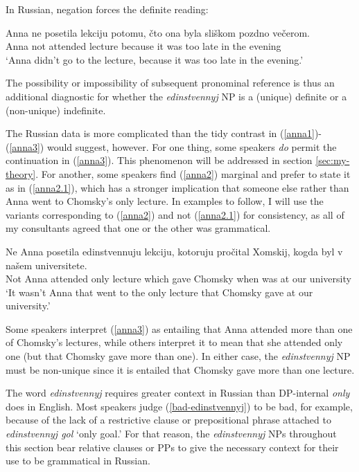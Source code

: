 In Russian, negation forces the definite reading:

\begin{exe}
	\ex \gll Anna ne posetila lekciju {potomu, \v{c}to} ona byla sli\v{s}kom pozdno ve\v{c}erom.\\
	Anna not attended lecture because it was too late {in the evening}\\
	\glt `Anna didn't go to the lecture, because it was too late in the evening.'
\end{exe}

The possibility or impossibility of subsequent pronominal reference is thus an additional diagnostic for whether the \textit{edinstvennyj} NP is a (unique) definite or a (non-unique) indefinite.

The Russian data is more complicated than the tidy contrast in (\ref{anna1})-(\ref{anna3}) would suggest, however. For one thing, some speakers \textit{do} permit the continuation in (\ref{anna3}). This phenomenon will be addressed in section \ref{sec:my-theory}. For another, some speakers find (\ref{anna2}) marginal and prefer to state it as in (\ref{anna2.1}), which has a stronger implication that someone else rather than Anna went to Chomsky's only lecture. In examples to follow, I will use the variants corresponding to (\ref{anna2}) and not (\ref{anna2.1}) for consistency, as all of my consultants agreed that one or the other was grammatical.

\begin{exe}
	\ex \label{anna2.1} \gll Ne Anna posetila edinstvennuju lekciju, kotoruju pro\v{c}ital Xomskij, kogda byl v na\v{s}em universitete.\\
	Not Anna attended only lecture which gave Chomsky when was at our university\\
	\glt `It wasn't Anna that went to the only lecture that Chomsky gave at our university.'
\end{exe}

Some speakers interpret (\ref{anna3}) as entailing that Anna attended more than one of Chomsky's lectures, while others interpret it to mean that she attended only one (but that Chomsky gave more than one). In either case, the \textit{edinstvennyj} NP must be non-unique since it is entailed that Chomsky gave more than one lecture.

The word \textit{edinstvennyj} requires greater context in Russian than DP-internal \textit{only} does in English. Most speakers judge (\ref{bad-edinstvennyj}) to be bad, for example, because of the lack of a restrictive clause or prepositional phrase attached to \textit{edinstvennyj gol} `only goal.' For that reason, the \textit{edinstvennyj} NPs throughout this section bear relative clauses or PPs to give the necessary context for their use to be grammatical in Russian.

